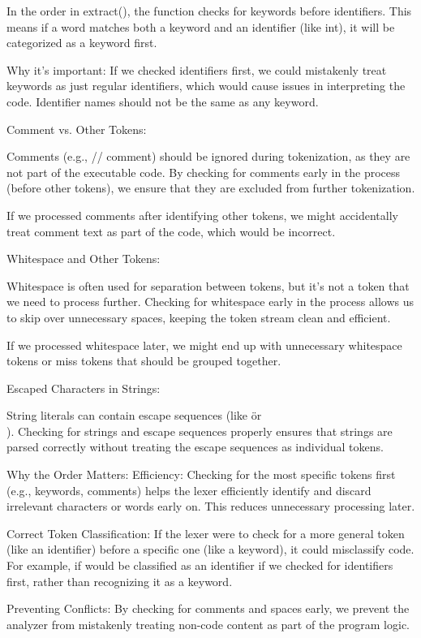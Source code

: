 \documentclass[12pt, a4paper]{report}
\begin{document}
In the order in extract(), the function checks for keywords before identifiers. This means if a word matches both a keyword and an identifier (like int), it will be categorized as a keyword first.

Why it's important: If we checked identifiers first, we could mistakenly treat keywords as just regular identifiers, which would cause issues in interpreting the code. Identifier names should not be the same as any keyword.

Comment vs. Other Tokens:

Comments (e.g., // comment) should be ignored during tokenization, as they are not part of the executable code. By checking for comments early in the process (before other tokens), we ensure that they are excluded from further tokenization.

If we processed comments after identifying other tokens, we might accidentally treat comment text as part of the code, which would be incorrect.

Whitespace and Other Tokens:

Whitespace is often used for separation between tokens, but it’s not a token that we need to process further. Checking for whitespace early in the process allows us to skip over unnecessary spaces, keeping the token stream clean and efficient.

If we processed whitespace later, we might end up with unnecessary whitespace tokens or miss tokens that should be grouped together.

Escaped Characters in Strings:

String literals can contain escape sequences (like \" or \\). Checking for strings and escape sequences properly ensures that strings are parsed correctly without treating the escape sequences as individual tokens.

Why the Order Matters:
Efficiency: Checking for the most specific tokens first (e.g., keywords, comments) helps the lexer efficiently identify and discard irrelevant characters or words early on. This reduces unnecessary processing later.

Correct Token Classification: If the lexer were to check for a more general token (like an identifier) before a specific one (like a keyword), it could misclassify code. For example, if would be classified as an identifier if we checked for identifiers first, rather than recognizing it as a keyword.

Preventing Conflicts: By checking for comments and spaces early, we prevent the analyzer from mistakenly treating non-code content as part of the program logic.
\end{document}
